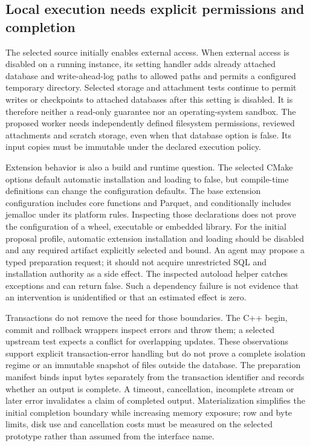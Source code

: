 \subsection{Local execution needs explicit permissions and completion}
\label{exec19:duckdb-controls}

The selected source initially enables external access. When external access is
disabled on a running instance, its setting handler adds already attached
database and write-ahead-log paths to allowed paths and permits a configured
temporary directory. Selected storage and attachment tests continue to permit
writes or checkpoints to attached databases after this setting is disabled.
It is therefore neither a read-only guarantee nor an operating-system sandbox.
The proposed worker needs independently defined filesystem permissions,
reviewed attachments and scratch storage, even when that database option is
false. Its input copies must be immutable under the declared execution policy.
\citep{exec19_duckdb_source}

Extension behavior is also a build and runtime question. The selected CMake
options default automatic installation and loading to false, but compile-time
definitions can change the configuration defaults. The base extension
configuration includes core functions and Parquet, and conditionally includes
jemalloc under its platform rules. Inspecting those declarations does not prove
the configuration of a wheel, executable or embedded library. For the initial
proposal profile, automatic extension installation and loading should be
disabled and any required artifact explicitly selected and bound. An agent
may propose a typed preparation request; it should not acquire unrestricted SQL
and installation authority as a side effect. The inspected autoload helper
catches exceptions and can return false. Such a dependency failure is not
evidence that an intervention is unidentified or that an estimated effect is
zero.~\citep{exec19_duckdb_source}

Transactions do not remove the need for those boundaries. The C++ begin,
commit and rollback wrappers inspect errors and throw them; a selected upstream
test expects a conflict for overlapping updates. These observations support
explicit transaction-error handling but do not prove a complete isolation
regime or an immutable snapshot of files outside the database. The preparation
manifest binds input bytes separately from the transaction identifier and
records whether an output is complete. A timeout, cancellation, incomplete
stream or later error invalidates a claim of completed output. Materialization
simplifies the initial completion boundary while increasing memory exposure;
row and byte limits, disk use and cancellation costs must be measured on the
selected prototype rather than assumed from the interface name.
\citep{exec19_duckdb_source}

